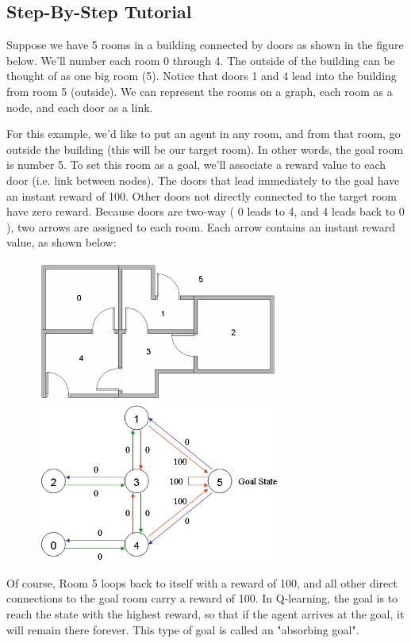 \documentclass[a4paper, 11pt]{article}
\begin{document}
\subsection{Step-By-Step Tutorial}
Suppose we have 5 rooms in a building connected by doors as shown in the figure below.  We'll number each room 0 through 4.  The outside of the building can be thought of as one big room (5).  Notice that doors 1 and 4 lead into the building from room 5 (outside). We can represent the rooms on a graph, each room as a node, and each door as a link.


For this example, we'd like to put an agent in any room, and from that room, go outside the building (this will be our target room). In other words, the goal room is number 5. To set this room as a goal, we'll associate a reward value to each door (i.e. link between nodes). The doors that lead immediately to the goal have an instant reward of 100.  Other doors not directly connected to the target room have zero reward. Because doors are two-way ( 0 leads to 4, and 4 leads back to 0 ), two arrows are assigned to each room. Each arrow contains an instant reward value, as shown below:

\begin{figure}[H]
\centering
\includegraphics[width=8cm]{fig/modeling_environment_clip_image002a}
\quad
\includegraphics[width=8cm]{fig/map2a}
\end{figure}

Of course, Room 5 loops back to itself with a reward of 100, and all other direct connections to the goal room carry a reward of 100.  In Q-learning, the goal is to reach the state with the highest reward, so that if the agent arrives at the goal, it will remain there forever. This type of goal is called an "absorbing goal".
\end{document}
